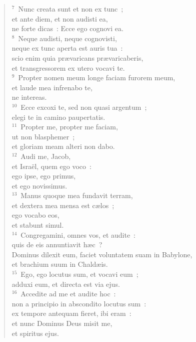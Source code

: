 \begin{verse}
${}^{7}$~Nunc creata sunt et non ex tunc~;\\ et ante diem, et non audisti ea,\\ ne forte dicas~: Ecce ego cognovi ea.\\
${}^{8}$~Neque audisti, neque cognovisti,\\ neque ex tunc aperta est auris tua~:\\ scio enim quia pr\ae varicans pr\ae varicaberis,\\ et transgressorem ex utero vocavi te.\\
${}^{9}$~Propter nomen meum longe faciam furorem meum,\\ et laude mea infrenabo te,\\ ne intereas.\\
${}^{10}$~Ecce excoxi te, sed non quasi argentum~;\\ elegi te in camino paupertatis.\\
${}^{11}$~Propter me, propter me faciam,\\ ut non blasphemer~;\\ et gloriam meam alteri non dabo.\\
${}^{12}$~Audi me, Jacob,\\ et Isra\"el, quem ego voco~:\\ ego ipse, ego primus,\\ et ego novissimus.\\
${}^{13}$~Manus quoque mea fundavit terram,\\ et dextera mea mensa est c\ae los~;\\ ego vocabo eos,\\ et stabunt simul.\\
${}^{14}$~Congregamini, omnes vos, et audite~:\\ quis de eis annuntiavit h\ae c~?\\ Dominus dilexit eum, faciet voluntatem suam in Babylone,\\ et brachium suum in Chald\ae is.\\
${}^{15}$~Ego, ego locutus sum, et vocavi eum~;\\ adduxi eum, et directa est via ejus.\\
${}^{16}$~Accedite ad me et audite hoc~:\\ non a principio in abscondito locutus sum~:\\ ex tempore antequam fieret, ibi eram~:\\ et nunc Dominus Deus misit me,\\ et spiritus ejus.\\

\end{verse}
